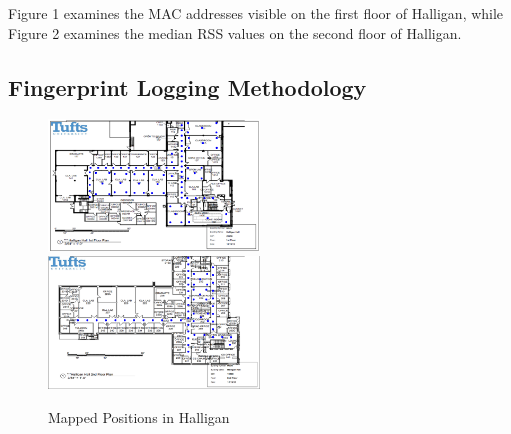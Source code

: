\documentclass[conference]{IEEEtran}
\begin{document}
Figure 1 examines the MAC addresses visible on the first floor of Halligan, while Figure 2 examines the median RSS values on the second floor of Halligan.

\subsection{Fingerprint Logging Methodology}

\begin{figure}[h!] 
  \centering
    \includegraphics[width=0.5\textwidth]{firstFloor.png}
    \includegraphics[width=0.5\textwidth]{secondFloor.png}
     \caption{Mapped Positions in Halligan}
\end{figure}
\end{document}
